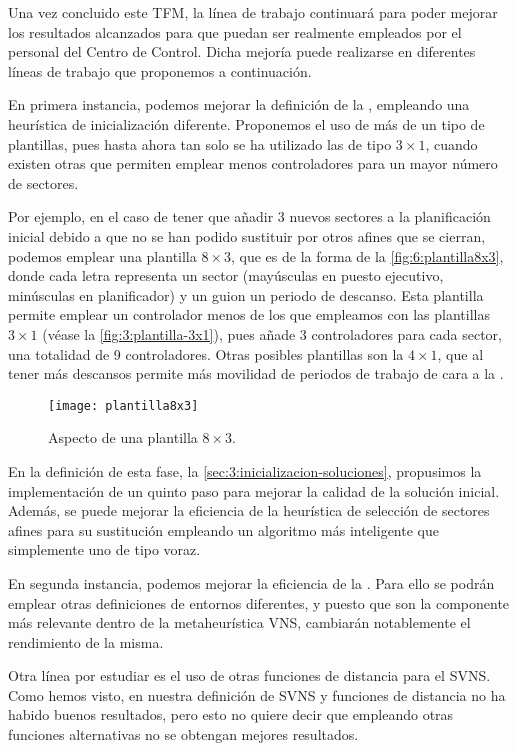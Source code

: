 Una vez concluido este TFM, la línea de trabajo continuará para poder mejorar los resultados alcanzados para que puedan ser realmente empleados por el personal del Centro de Control. Dicha mejoría puede realizarse en diferentes líneas de trabajo que proponemos a continuación.

En primera instancia, podemos mejorar la definición de la \faseuno{}, empleando una heurística de inicialización diferente. Proponemos el uso de más de un tipo de plantillas, pues hasta ahora tan solo se ha utilizado las de tipo $3\times1$, cuando existen otras que permiten emplear menos controladores para un mayor número de sectores. 

Por ejemplo, en el caso de tener que añadir 3 nuevos sectores a la planificación inicial debido a que no se han podido sustituir por otros afines que se cierran, podemos emplear una plantilla $8\times3$, que es de la forma de la \autoref{fig:6:plantilla8x3}, donde cada letra representa un sector (mayúsculas en puesto ejecutivo, minúsculas en planificador) y un guion un periodo de descanso. Esta plantilla permite emplear un controlador menos de los que empleamos con las plantillas $3\times1$ (véase la \autoref{fig:3:plantilla-3x1}), pues añade 3 controladores para cada sector, una totalidad de 9 controladores. Otras posibles plantillas son la $4\times1$, que al tener más descansos permite más movilidad de periodos de trabajo de cara a la \fasedos{}. 

\begin{figure}
	\centering
	\texttt{[image: plantilla8x3]}
	\caption{Aspecto de una plantilla $8\times3$.}
	\label{fig:6:plantilla8x3}
\end{figure}

En la definición de esta fase, la \autoref{sec:3:inicializacion-soluciones}, propusimos la implementación de un quinto paso para mejorar la calidad de la solución inicial. 
Además, se puede mejorar la eficiencia de la heurística de selección de sectores afines para su sustitución empleando un algoritmo más inteligente que simplemente uno de tipo voraz.

En segunda instancia, podemos mejorar la eficiencia de la \fasedos{}. Para ello se podrán emplear otras definiciones de entornos diferentes, y puesto que son la componente más relevante dentro de la metaheurística VNS, cambiarán notablemente el rendimiento de la misma. 

Otra línea por estudiar es el uso de otras funciones de distancia para el SVNS. Como hemos visto, en nuestra definición de SVNS y funciones de distancia no ha habido buenos resultados, pero esto no quiere decir que empleando otras funciones alternativas no se obtengan mejores resultados. 

